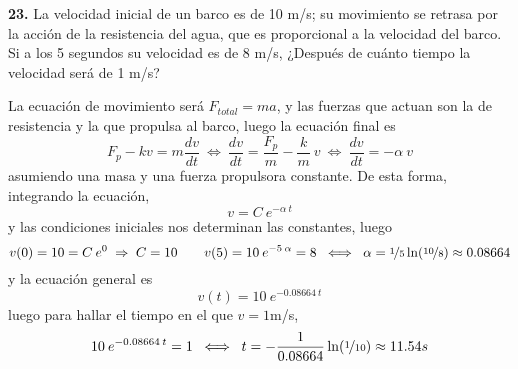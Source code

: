 \begin{enumerate}
\textbf{23.}  La velocidad inicial de un barco es de 10 m/s; su movimiento se retrasa por la
acción de la resistencia del agua, que es proporcional a la velocidad del barco. Si a los 5 segundos su velocidad es de 8 m/s, ¿Después de cuánto tiempo la velocidad será de 1 m/s?
\begin{sol}
  La ecuación de movimiento será $F_{total}=ma$, y las fuerzas que actuan son la de resistencia y la que propulsa al barco, luego la ecuación final es
  $$F_{p}-kv=m\dfrac{dv}{dt} \: \iff \: \dfrac{dv}{dt}=\dfrac{F_p}{m}-\dfrac{k}{m}\: v \: \iff \: \dfrac{dv}{dt}=-\alpha \: v $$
  asumiendo una masa y una fuerza propulsora constante. De esta forma, integrando la ecuación, 
  $$v=C \: e^{-\alpha \: t}$$
  y las condiciones iniciales nos determinan las constantes, luego 
  $$v(0)=10=C \: e^0 \; \Rightarrow \; C=10 \qquad v(5)=10 \: e^{-5 \:\alpha }=8 \; \iff \; \alpha=\nicefrac{1}{5} \ln(\nicefrac{10}{8}) \approx 0.08664$$
  y la ecuación general es 
  $$v(t)=10 \: e^{-0.08664 \: t}$$
  luego para hallar el tiempo en el que $v=1$m/s,
  $$10 \: e^{-0.08664 \: t} = 1 \; \iff \; t=-\dfrac{1}{0.08664}\ln(\nicefrac{1}{10}) \approx 11.54 s$$
\end{sol}


\end{enumerate}
